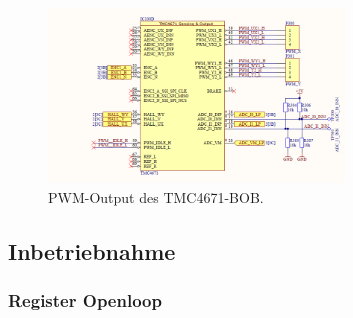 \begin{figure}[H]
	\centering
	\includegraphics[width=0.7\textwidth]{graphics/TMC4671_PWM_BOB_Schematic}
	\caption{PWM-Output des TMC4671-BOB. \cite[S.3]{trinamicmotion_control_gmbh__co_kg_tmc4671-bob_2020}}
	\label{fig:Schema_PWM_FOC_Treiber}
\end{figure} 

\subsection{Inbetriebnahme}

\subsubsection{Register Openloop}\label{Appendix:TMC4671_Register}

